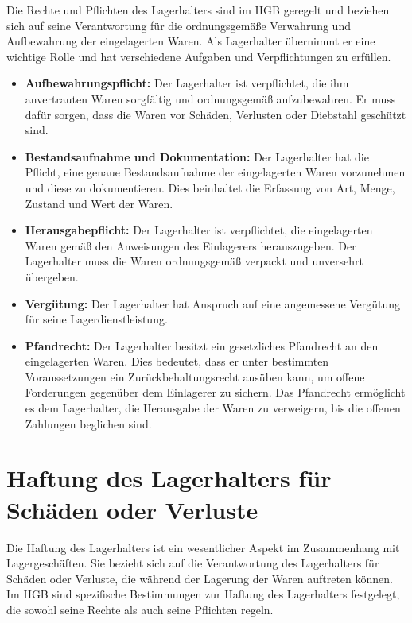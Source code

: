 Die Rechte und Pflichten des Lagerhalters sind im HGB geregelt und beziehen sich auf seine Verantwortung für die ordnungsgemäße Verwahrung und Aufbewahrung der eingelagerten Waren. Als Lagerhalter übernimmt er eine wichtige Rolle und hat verschiedene Aufgaben und Verpflichtungen zu erfüllen.
\begin{itemize}
    \item \textbf{Aufbewahrungspflicht:} Der Lagerhalter ist verpflichtet, die ihm anvertrauten Waren sorgfältig und ordnungsgemäß aufzubewahren. Er muss dafür sorgen, dass die Waren vor Schäden, Verlusten oder Diebstahl geschützt sind.
    \item \textbf{Bestandsaufnahme und Dokumentation:} Der Lagerhalter hat die Pflicht, eine genaue Bestandsaufnahme der eingelagerten Waren vorzunehmen und diese zu dokumentieren. Dies beinhaltet die Erfassung von Art, Menge, Zustand und Wert der Waren.
    \item \textbf{Herausgabepflicht:} Der Lagerhalter ist verpflichtet, die eingelagerten Waren gemäß den Anweisungen des Einlagerers herauszugeben. Der Lagerhalter muss die Waren ordnungsgemäß verpackt und unversehrt übergeben.
    \item \textbf{Vergütung:} Der Lagerhalter hat Anspruch auf eine angemessene Vergütung für seine Lagerdienstleistung.
    \item \textbf{Pfandrecht:} Der Lagerhalter besitzt ein gesetzliches Pfandrecht an den eingelagerten Waren. Dies bedeutet, dass er unter bestimmten Voraussetzungen ein Zurückbehaltungsrecht ausüben kann, um offene Forderungen gegenüber dem Einlagerer zu sichern. Das Pfandrecht ermöglicht es dem Lagerhalter, die Herausgabe der Waren zu verweigern, bis die offenen Zahlungen beglichen sind.
\end{itemize}

\section{Haftung des Lagerhalters für Schäden oder Verluste}
Die Haftung des Lagerhalters ist ein wesentlicher Aspekt im Zusammenhang mit Lagergeschäften. Sie bezieht sich auf die Verantwortung des Lagerhalters für Schäden oder Verluste, die während der Lagerung der Waren auftreten können. Im HGB sind spezifische Bestimmungen zur Haftung des Lagerhalters festgelegt, die sowohl seine Rechte als auch seine Pflichten regeln.

